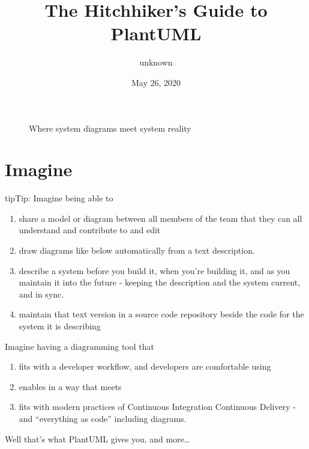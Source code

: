\documentclass[letterpaper,10pt,english]{sphinxmanual}
\title{The Hitchhiker's Guide to PlantUML}
\date{May 26, 2020}
\author{unknown}
\let\sphinxpxdimen\pdfpxdimen\else\newdimen\sphinxpxdimen
\begin{document}
\pagestyle{empty}
\sphinxmaketitle
\pagestyle{plain}
\sphinxtableofcontents
\pagestyle{normal}
\label{\detokenize{index::doc}}


\begin{figure}[htbp]
\centering
\capstart

\noindent\sphinxincludegraphics[width=120\sphinxpxdimen,height=120\sphinxpxdimen]{{plantumllogo1}.png}
\caption{Where system diagrams meet system reality}\label{\detokenize{index:id2}}\end{figure}


\chapter{Imagine}
\label{\detokenize{index:imagine}}
\begin{sphinxadmonition}{tip}{Tip:}
Imagine being able to
\begin{enumerate}
%
\item {} 
share a model or diagram between all members of the team that they can all understand and contribute to and edit

\item {} 
draw diagrams like below automatically from a text description.

\item {} 
describe a system before you build it, when you’re building it, and as you maintain it into the future - keeping the description and the system current, and in sync.

\item {} 
maintain that text version in a source code repository beside the code for the system it is describing

\end{enumerate}

Imagine having a diagramming tool that
\begin{enumerate}
%
\item {} 
fits with a developer workflow, and developers are comfortable using

\item {} 
enables   in a way that meets 

\item {} 
fits with modern practices of Continuous Integration Continuous Delivery - and “everything as code” including diagrams.

\end{enumerate}

Well that’s what PlantUML gives you, and more…
\end{sphinxadmonition}
\end{document}
